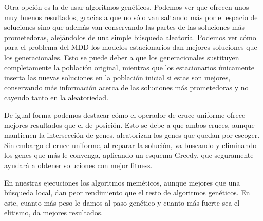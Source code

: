 Otra opción es la de usar algoritmos genéticos. Podemos ver que ofrecen unos muy buenos resultados, gracias a que no sólo van saltando más por el espacio de soluciones
sino que además van conservando las partes de las soluciones más prometedoras, alejándolos de una simple búsqueda aleatoria. Podemos ver cómo para el problema del MDD los modelos
estacionarios dan mejores soluciones que los generacionales. Esto se puede deber a que los generacionales sustituyen completamente la población original, mientras que los estacionarios
únicamente inserta las nuevas soluciones en la población inicial si estas son mejores, conservando más información acerca de las soluciones más prometedoras y no cayendo tanto en la aleatoriedad.

De igual forma podemos destacar cómo el operador de cruce uniforme ofrece mejores resultados que el de posición. Esto se debe a que ambos cruces, aunque mantienen la intersección de genes,
aleatorizan los genes que quedan por escoger. Sin embargo el cruce uniforme, al reparar la solución, va buscando y eliminando los genes que más le convenga, aplicando un esquema Greedy, que
seguramente ayudará a obtener soluciones con mejor fitness.

En nuestras ejecuciones los algoritmos meméticos, aunque mejores que una búsqueda local, dan peor rendimiento que el resto de algoritmos genéticos.
En este, cuanto más peso le damos al paso genético y cuanto más fuerte sea el elitismo, da mejores resultados.










